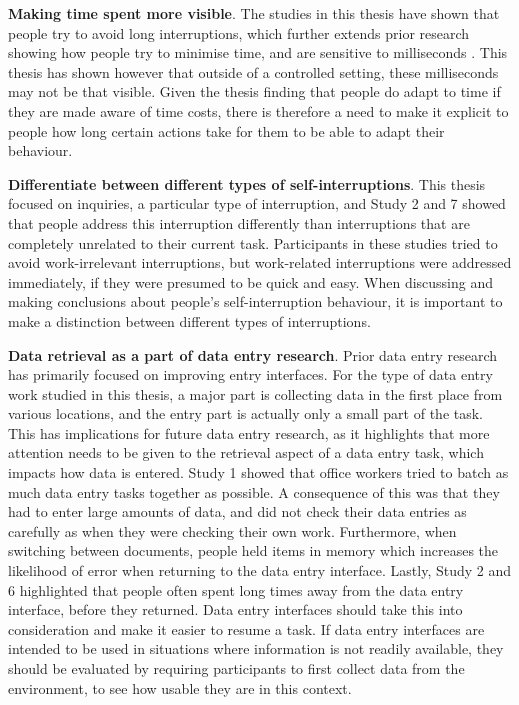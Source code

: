 
\textbf{Making time spent more visible}. The studies in this thesis have shown that people try to avoid long interruptions, which further extends prior research showing how people try to minimise time, and are sensitive to milliseconds \citep{Charman2003, Gray2004}. This thesis has shown however that outside of a controlled setting, these milliseconds may not be that visible. Given the thesis finding that people do adapt to time if they are made aware of time costs, there is therefore a need to make it explicit to people how long certain actions take for them to be able to adapt their behaviour.

\textbf{Differentiate between different types of self-interruptions}. This thesis focused on inquiries, a particular type of interruption, and Study 2 and 7 showed that people address this interruption differently than interruptions that are completely unrelated to their current task. Participants in these studies tried to avoid work-irrelevant interruptions, but work-related interruptions were addressed immediately, if they were presumed to be quick and easy. When discussing and making conclusions about people's self-interruption behaviour, it is important to make a distinction between different types of interruptions.

\textbf{Data retrieval as a part of data entry research}. Prior data entry research has primarily focused on improving entry interfaces. For the type of data entry work studied in this thesis, a major part is collecting data in the first place from various locations, and the entry part is actually only a small part of the task. This has implications for future data entry research, as it highlights that more attention needs to be given to the retrieval aspect of a data entry task, which impacts how data is entered. Study 1 showed that office workers tried to batch as much data entry tasks together as possible. A consequence of this was that they had to enter large amounts of data, and did not check their data entries as carefully as when they were checking their own work. Furthermore, when switching between documents, people held items in memory which increases the likelihood of error when returning to the data entry interface. Lastly, Study 2 and 6 highlighted that people often spent long times away from the data entry interface, before they returned. Data entry interfaces should take this into consideration and make it easier to resume a task. If data entry interfaces are intended to be used in situations where information is not readily available, they should be evaluated by requiring participants to first collect data from the environment, to see how usable they are in this context.

